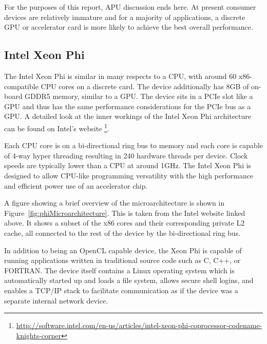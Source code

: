For the purposes of this report, APU discussion ends here. At present consumer
devices are relatively immature and for a majority of applications, a discrete
GPU or accelerator card is more likely to achieve the best overall performance.

\subsection{Intel Xeon Phi}

The Intel Xeon Phi is similar in many respects to a CPU, with around 60
x86-compatible CPU cores on a discrete card. The device additionally has 8GB of
on-board GDDR5 memory, similar to a GPU. The device sits in a PCIe slot like a
GPU and thus has the same performance considerations for the PCIe bus as a GPU.
A detailed look at the inner workings of the Intel Xeon Phi architecture can be
found on Intel's website
\footnote{\url{http://software.intel.com/en-us/articles/intel-xeon-phi-coprocessor-codename-knights-corner}}.

Each CPU core is on a bi-directional ring bus to memory and each core is capable
of 4-way hyper threading resulting in 240 hardware threads per device. Clock
speeds are typically lower than a CPU at around 1GHz. The Intel Xeon Phi is
designed to allow CPU-like programming versatility with the high performance and
efficient power use of an accelerator chip.

A figure showing a brief overview of the microarchitecture is shown in
Figure~\ref{fig:phiMicroarchitecture}. This is taken from the  Intel website linked
above. It shows a subset of the x86 cores and their corresponding private L2
cache, all connected to the rest of the device by the bi-directional ring bus.

In addition to being an OpenCL capable device, the Xeon Phi is capable of
running applications written in traditional source code such as C, C++, or
FORTRAN. The device itself contains a Linux operating system which is
automatically started up and loads a file system, allows secure shell logins,
and enables a TCP/IP stack to facilitate communication as if the device was a
separate internal network device.


